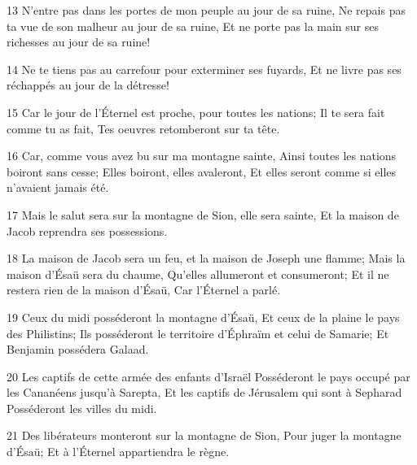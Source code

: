 \par 13 N'entre pas dans les portes de mon peuple au jour de sa ruine, Ne repais pas ta vue de son malheur au jour de sa ruine, Et ne porte pas la main sur ses richesses au jour de sa ruine!
\par 14 Ne te tiens pas au carrefour pour exterminer ses fuyards, Et ne livre pas ses réchappés au jour de la détresse!
\par 15 Car le jour de l'Éternel est proche, pour toutes les nations; Il te sera fait comme tu as fait, Tes oeuvres retomberont sur ta tête.
\par 16 Car, comme vous avez bu sur ma montagne sainte, Ainsi toutes les nations boiront sans cesse; Elles boiront, elles avaleront, Et elles seront comme si elles n'avaient jamais été.
\par 17 Mais le salut sera sur la montagne de Sion, elle sera sainte, Et la maison de Jacob reprendra ses possessions.
\par 18 La maison de Jacob sera un feu, et la maison de Joseph une flamme; Mais la maison d'Ésaü sera du chaume, Qu'elles allumeront et consumeront; Et il ne restera rien de la maison d'Ésaü, Car l'Éternel a parlé.
\par 19 Ceux du midi posséderont la montagne d'Ésaü, Et ceux de la plaine le pays des Philistins; Ils posséderont le territoire d'Éphraïm et celui de Samarie; Et Benjamin possédera Galaad.
\par 20 Les captifs de cette armée des enfants d'Israël Posséderont le pays occupé par les Cananéens jusqu'à Sarepta, Et les captifs de Jérusalem qui sont à Sepharad Posséderont les villes du midi.
\par 21 Des libérateurs monteront sur la montagne de Sion, Pour juger la montagne d'Ésaü; Et à l'Éternel appartiendra le règne.


